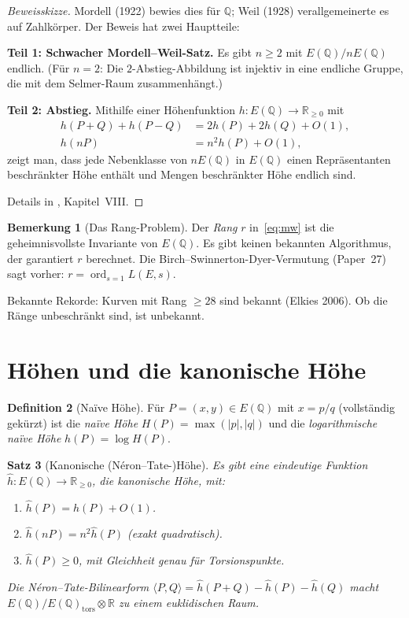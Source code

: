 \documentclass[12pt,a4paper]{amsart}
\newtheorem{theorem}{Satz}[section]
\theoremstyle{definition}
\newtheorem{definition}[theorem]{Definition}
\newtheorem{remark}[theorem]{Bemerkung}
\newcommand{\Q}{\mathbb{Q}}
\newcommand{\R}{\mathbb{R}}
\DeclareMathOperator{\ord}{ord}
\begin{document}
\begin{proof}[Beweisskizze]
Mordell (1922) bewies dies f\"ur $\Q$; Weil (1928) verallgemeinerte es auf
Zahlk\"orper.
Der Beweis hat zwei Hauptteile:

\textbf{Teil 1: Schwacher Mordell--Weil-Satz.}
Es gibt $n \ge 2$ mit $E(\Q)/nE(\Q)$ endlich.
(F\"ur $n=2$: Die $2$-Abstieg-Abbildung ist injektiv in eine endliche
Gruppe, die mit dem Selmer-Raum zusammenh\"angt.)

\textbf{Teil 2: Abstieg.}
Mithilfe einer H\"ohenfunktion $h: E(\Q) \to \R_{\ge 0}$ mit
\begin{align}
  h(P+Q) + h(P-Q) &= 2h(P) + 2h(Q) + O(1), \\
  h(nP) &= n^2 h(P) + O(1),
\end{align}
zeigt man, dass jede Nebenklasse von $nE(\Q)$ in $E(\Q)$ einen
Repr\"asentanten beschr\"ankter H\"ohe enth\"alt und Mengen beschr\"ankter
H\"ohe endlich sind.

Details in \cite{Silverman1986}, Kapitel~VIII.
\end{proof}

\begin{remark}[Das Rang-Problem]
Der \emph{Rang} $r$ in~\eqref{eq:mw} ist die geheimnisvollste Invariante
von $E(\Q)$. Es gibt keinen bekannten Algorithmus, der garantiert $r$
berechnet.
Die Birch--Swinnerton-Dyer-Vermutung (Paper~27) sagt vorher:
$r = \ord_{s=1} L(E,s)$.

Bekannte Rekorde: Kurven mit Rang $\ge 28$ sind bekannt (Elkies 2006).
Ob die R\"ange unbeschr\"ankt sind, ist unbekannt.
\end{remark}

\section{H\"ohen und die kanonische H\"ohe}

\begin{definition}[Na\"ive H\"ohe]
\label{def:naive_height}
F\"ur $P = (x,y) \in E(\Q)$ mit $x = p/q$ (vollst\"andig gek\"urzt) ist
die \emph{na\"ive H\"ohe} $H(P) = \max(|p|,|q|)$ und die
\emph{logarithmische na\"ive H\"ohe} $h(P) = \log H(P)$.
\end{definition}

\begin{theorem}[Kanonische (N\'eron--Tate-)H\"ohe]
\label{thm:neron_tate}
Es gibt eine eindeutige Funktion $\hat h: E(\Q) \to \R_{\ge 0}$,
die \emph{kanonische H\"ohe}, mit:
\begin{enumerate}
  \item[\textup{(i)}] $\hat h(P) = h(P) + O(1)$.
  \item[\textup{(ii)}] $\hat h(nP) = n^2 \hat h(P)$ (exakt quadratisch).
  \item[\textup{(iii)}] $\hat h(P) \ge 0$, mit Gleichheit genau f\"ur
    Torsionspunkte.
\end{enumerate}
Die \emph{N\'eron--Tate-Bilinearform}
$\langle P, Q \rangle = \hat h(P+Q) - \hat h(P) - \hat h(Q)$
macht $E(\Q)/E(\Q)_{\mathrm{tors}} \otimes \R$ zu einem euklidischen Raum.
\end{theorem}
\end{document}
